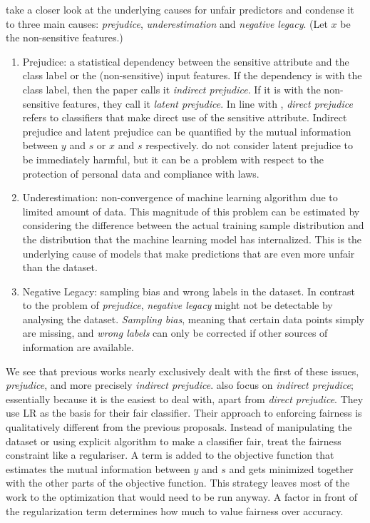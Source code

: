 \citet{kamishima2011fairness} take a closer look
at the underlying causes for unfair predictors and condense it to three main causes:
\emph{prejudice}, \emph{underestimation} and \emph{negative legacy}.
(Let \(x\) be the non-sensitive features.)

\begin{enumerate}
\item
  Prejudice:
  a statistical dependency between the sensitive attribute
  and the class label or the (non-sensitive) input features.
  If the dependency is with the class label, then the paper calls it \emph{indirect prejudice}.
  If it is with the non-sensitive features, they call it \emph{latent prejudice}.
  In line with \citet{pedreshi2008discrimination},
  \emph{direct prejudice} refers to classifiers that make direct use of the sensitive attribute.
  Indirect prejudice and latent prejudice can be quantified by
  the mutual information between \(y\) and \(s\) or \(x\) and \(s\) respectively.
  \citet{kamishima2011fairness} do not consider latent prejudice to be immediately harmful,
  but it can be a problem with respect to the protection of personal data and compliance with laws.
\item
  Underestimation:
  non-convergence of machine learning algorithm due to limited amount of data.
  This magnitude of this problem can be estimated
  by considering the difference between the actual training sample distribution
  and the distribution that the machine learning model has internalized.
  This is the underlying cause of models that make predictions
  that are even more unfair than the dataset.
\item
  Negative Legacy:
  sampling bias and wrong labels in the dataset.
  In contrast to the problem of \emph{prejudice},
  \emph{negative legacy} might not be detectable by analysing the dataset.
  \emph{Sampling bias}, meaning that certain data points simply are missing,
  and \emph{wrong labels} can only be corrected if other sources of information are available.
\end{enumerate}

We see that previous works nearly exclusively dealt with the first of these issues, \emph{prejudice},
and more precisely \emph{indirect prejudice}.
\citet{kamishima2011fairness} also focus on \emph{indirect prejudice};
essentially because it is the easiest to deal with, apart from \emph{direct prejudice}.
They use \acf{LR} as the basis for their fair classifier.
Their approach to enforcing fairness is qualitatively different from the previous proposals.
Instead of manipulating the dataset or using explicit algorithm to make a classifier fair,
\citet{kamishima2011fairness} treat the fairness constraint like a regulariser.
A term is added to the objective function
that estimates the mutual information between \(y\) and \(s\)
and gets minimized together with the other parts of the objective function.
This strategy leaves most of the work to the optimization that would need to be run anyway.
A factor in front of the regularization term determines how much to value fairness over accuracy.

